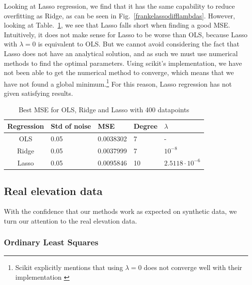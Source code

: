 \documentclass[twocolumn,10pt,cleanfoot]{asme2ej}
\begin{document}
Looking at Lasso regression, we find that it has the same capability to reduce overfitting as Ridge, as can be seen in Fig.~\ref{frankelassodifflambdas}. However, looking at Table.~\ref{ols_vs_ridge_vs_lasso_table}, we see that Lasso falls short when finding a good MSE. Intuitively, it does not make sense for Lasso to be worse than OLS, because Lasso with $\lambda = 0$ is equivalent to OLS. But we cannot avoid considering the fact that Lasso does not have an analytical solution, and as such we must use numerical methods to find the optimal parameters. Using scikit's implementation, we have not been able to get the numerical method to converge, which means that we have not found a global minimum.\footnote{Scikit explicitly mentions that using $\lambda = 0$ does not converge well with their implementation \cite{lasso}} For this reason, Lasso regression has not given satisfying results.

\begin{table}[t]
\caption{Best MSE for OLS, Ridge and Lasso with 400 datapoints}
\begin{center}
\label{ols_vs_ridge_vs_lasso_table}
\begin{tabular}{c | l l l l}
Regression & Std of noise & MSE & Degree & $\lambda$ \\
\hline
OLS & 0.05 & 0.0038302 & 7 & - \\
Ridge & 0.05 & 0.0037999 & 7 & $10^{-8}$ \\
Lasso & 0.05 & 0.0095846 & 10 & $2.5118 \cdot 10^{-6}$ \\
\hline
\end{tabular}
\end{center}
\end{table}


\subsection{Real elevation data}

With the confidence that our methods work as expected on synthetic data, we turn our attention to the real elevation data. 

\subsubsection{Ordinary Least Squares}
\end{document}
